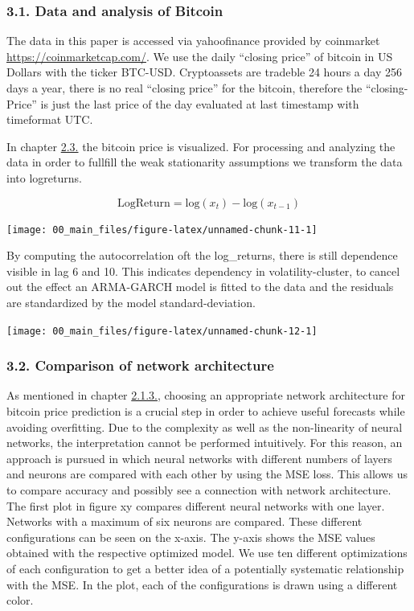 \documentclass[
]{article}
\begin{document}
\hypertarget{data-and-analysis-of-bitcoin}{%
\subsubsection{3.1. Data and analysis of
Bitcoin}\label{data-and-analysis-of-bitcoin}}

The data in this paper is accessed via yahoofinance provided by
coinmarket \url{https://coinmarketcap.com/}. We use the daily ``closing
price'' of bitcoin in US Dollars with the ticker BTC-USD. Cryptoassets
are tradeble 24 hours a day 256 days a year, there is no real ``closing
price'' for the bitcoin, therefore the ``closing-Price'' is just the
last price of the day evaluated at last timestamp with timeformat UTC.

In chapter \protect\hyperlink{bitcoin}{2.3.} the bitcoin price is
visualized. For processing and analyzing the data in order to fullfill
the weak stationarity assumptions we transform the data into logreturns.

\[\mathrm{LogReturn} = \mathrm{log}(x_{t})-\mathrm{log}(x_{t-1})\]

\begin{center}\texttt{[image: 00\_main\_files/figure-latex/unnamed-chunk-11-1]} \end{center}

By computing the autocorrelation oft the log\_returns, there is still
dependence visible in lag 6 and 10. This indicates dependency in
volatility-cluster, to cancel out the effect an ARMA-GARCH model is
fitted to the data and the residuals are standardized by the model
standard-deviation.

\begin{center}\texttt{[image: 00\_main\_files/figure-latex/unnamed-chunk-12-1]} \end{center}

\hypertarget{comparison-of-network-architecture}{%
\subsubsection{3.2. Comparison of network
architecture}\label{comparison-of-network-architecture}}

As mentioned in chapter \protect\hyperlink{MLP}{2.1.3.}, choosing an
appropriate network architecture for bitcoin price prediction is a
crucial step in order to achieve useful forecasts while avoiding
overfitting. Due to the complexity as well as the non-linearity of
neural networks, the interpretation cannot be performed intuitively. For
this reason, an approach is pursued in which neural networks with
different numbers of layers and neurons are compared with each other by
using the MSE loss. This allows us to compare accuracy and possibly see
a connection with network architecture. The first plot in figure xy
compares different neural networks with one layer. Networks with a
maximum of six neurons are compared. These different configurations can
be seen on the x-axis. The y-axis shows the MSE values obtained with the
respective optimized model. We use ten different optimizations of each
configuration to get a better idea of a potentially systematic
relationship with the MSE. In the plot, each of the configurations is
drawn using a different color.
\end{document}
